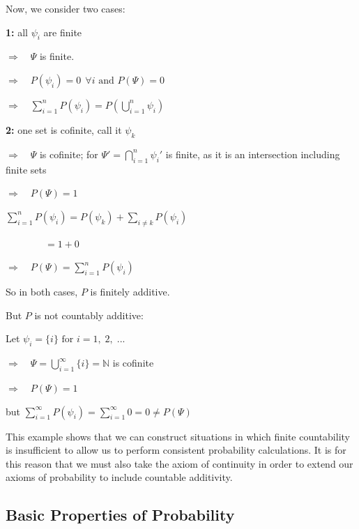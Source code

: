 \documentclass[12pt,a4paper]{article}
\begin{document}
\noindent Now, we consider two cases:\par
\vspace{10pt}
\textbf{1: } all $\psi_i$ are finite\par
\indent\indent $\Rightarrow \quad\Psi$ is finite.\par
\indent\indent $\Rightarrow \quad P(\psi_i) = 0 \:\:\forall i \text{ and } P(\Psi) = 0$\par
\indent\indent $\Rightarrow \quad\sum\limits_{i=1}^{n}P(\psi_i) = P(\bigcup_{i=1}^{n}\psi_i)$\par
\vspace{10pt}
\textbf{2: } one set is cofinite, call it $\psi_k$\par
\indent\indent $\Rightarrow\quad \Psi$ is cofinite; for $\Psi' = \bigcap_{i=1}^n\psi_i'$ is finite, as it is an intersection including finite sets\par
\indent\indent $\Rightarrow\quad P(\Psi)=1$\par
\indent\indent $\sum\limits_{i=1}^nP(\psi_i) = P(\psi_k) + \sum\limits_{i\neq k}P(\psi_i)$\par
\indent\indent $\qquad\qquad = 1 + 0$\par
\indent\indent $\Rightarrow\quad P(\Psi) = \sum\limits_{i=1}^nP(\psi_i)$\par
So in both cases, $P$ is finitely additive.\par
\vspace{12pt}
But $P$ is not countably additive:\par
Let $\psi_i = \{i\} \text{ for } i = 1,\;2,\;...$\par
$\Rightarrow\quad \Psi = \bigcup_{i=1}^{\infty}\{i\} = \mathbb{N}$ is cofinite\par
$\Rightarrow\quad P(\Psi) = 1$\par
but $\sum\limits_{i=1}^{\infty}P(\psi_i) = \sum\limits_{i=1}^{\infty}0 = 0 \neq P(\Psi)$\par
\vspace{12pt}
\indent This example shows that we can construct situations in which finite countability is insufficient to allow us to perform consistent probability calculations. It is for this reason that we must also take the axiom of continuity in order to extend our axioms of probability to include countable additivity.


\subsection{Basic Properties of Probability}$\;$
\end{document}
